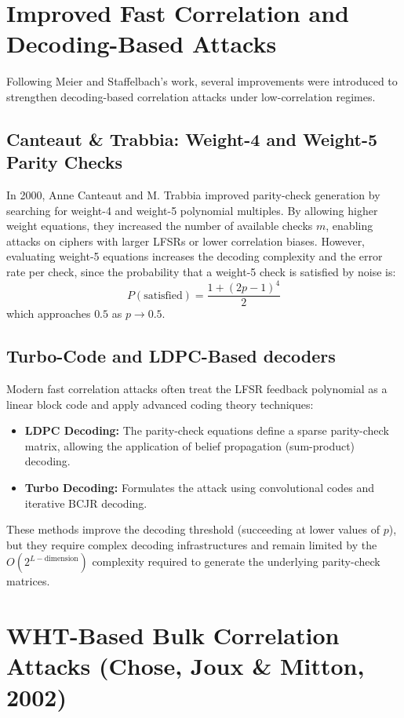 \section{Improved Fast Correlation and Decoding-Based Attacks}
\label{sec:improved_fca}

Following Meier and Staffelbach's work, several improvements were introduced to strengthen decoding-based correlation attacks under low-correlation regimes.

\subsection{Canteaut \& Trabbia: Weight-4 and Weight-5 Parity Checks}
In 2000, Anne Canteaut and M. Trabbia \cite{canteaut2000} improved parity-check generation by searching for weight-4 and weight-5 polynomial multiples. By allowing higher weight equations, they increased the number of available checks $m$, enabling attacks on ciphers with larger LFSRs or lower correlation biases. However, evaluating weight-5 equations increases the decoding complexity and the error rate per check, since the probability that a weight-5 check is satisfied by noise is:
$$P(\text{satisfied}) = \frac{1 + (2p-1)^4}{2}$$
which approaches $0.5$ as $p \to 0.5$.

\subsection{Turbo-Code and LDPC-Based decoders}
Modern fast correlation attacks often treat the LFSR feedback polynomial as a linear block code and apply advanced coding theory techniques:
\begin{itemize}
    \item \textbf{LDPC Decoding:} The parity-check equations define a sparse parity-check matrix, allowing the application of belief propagation (sum-product) decoding.
    \item \textbf{Turbo Decoding:} Formulates the attack using convolutional codes and iterative BCJR decoding.
\end{itemize}
These methods improve the decoding threshold (succeeding at lower values of $p$), but they require complex decoding infrastructures and remain limited by the $O(2^{L - \text{dimension}})$ complexity required to generate the underlying parity-check matrices.

\section{WHT-Based Bulk Correlation Attacks (Chose, Joux \& Mitton, 2002)}
\label{sec:cjm_attack}

